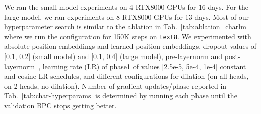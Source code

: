 We ran the small model experiments on 4 RTX8000 GPUs for 16 days.
For the large model, we ran experiments on 8 RTX8000 GPUs for 
13 days. 
Most of our hyperparameter search is similar to the ablation in Tab.~\ref{tab:ablation_charlm} where we run the configuration for 150K steps
on \texttt{text8}.
We experimented with absolute position embeddings and learned position embeddings,
dropout values of [0.1, 0.2] (small model) and [0.1, 0.4] (large model), 
pre-layernorm and post-layernorm~\cite{layernorm}, learning rate (LR) of phase1 of values 
[2.5e-5, 5e-4, 1e-4]
constant and cosine LR schedules, 
and different configurations for dilation (on all heads, on 2 heads, no dilation).
Number of gradient updates/phase
reported in Tab.~\ref{tab:char-hyperparams} is determined by running each phase until the validation BPC stops getting better. 


